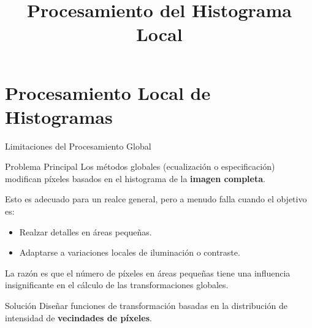 \documentclass{beamer}
\begin{document}


\title[Ejemplo]{Procesamiento del Histograma Local}
\subtitle{}
\author[Tu Nombre/Institución]{}
\date{}
\institute{}
\begin{frame}
  \titlepage
\end{frame}

\section{Procesamiento Local de Histogramas}
\begin{frame}{Limitaciones del Procesamiento Global}
    \begin{block}{Problema Principal}
        Los métodos globales (ecualización o especificación) modifican píxeles basados en el histograma de la \textbf{imagen completa}.
    \end{block}
    Esto es adecuado para un realce general, pero a menudo falla cuando el objetivo es:
    \begin{itemize}
        \item Realzar detalles en áreas pequeñas.
        \item Adaptarse a variaciones locales de iluminación o contraste.
    \end{itemize}
    La razón es que el número de píxeles en áreas pequeñas tiene una influencia insignificante en el cálculo de las transformaciones globales.
    \begin{alertblock}{Solución}
        Diseñar funciones de transformación basadas en la distribución de intensidad de \textbf{vecindades de píxeles}.
    \end{alertblock}
\end{frame}
\end{document}

